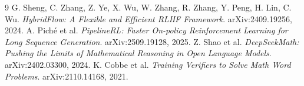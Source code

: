 \documentclass[11pt]{article}
\begin{document}
\begin{thebibliography}{9}
 G. Sheng, C. Zhang, Z. Ye, X. Wu, W. Zhang, R. Zhang, Y. Peng, H. Lin, C. Wu.
\emph{HybridFlow: A Flexible and Efficient RLHF Framework}. arXiv:2409.19256, 2024.
 A. Piché et al. \emph{PipelineRL: Faster On-policy Reinforcement Learning
for Long Sequence Generation}. arXiv:2509.19128, 2025.
 Z. Shao et al. \emph{DeepSeekMath: Pushing the Limits of Mathematical Reasoning
in Open Language Models}. arXiv:2402.03300, 2024.
 K. Cobbe et al. \emph{Training Verifiers to Solve Math Word Problems}.
arXiv:2110.14168, 2021.
\end{thebibliography}
\end{document}

